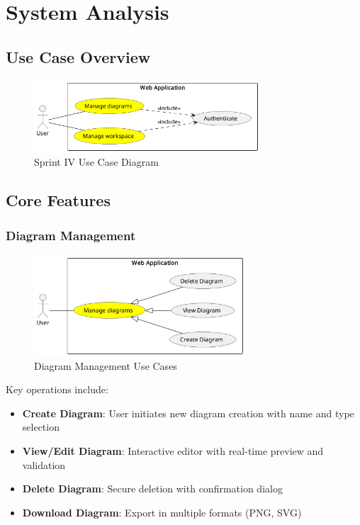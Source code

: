 \section{System Analysis}

\subsection{Use Case Overview}

\begin{figure}[H]
\centering
\includegraphics[width=0.75\textwidth]{conception/SprintIV/use_case_diagrams/use_case_diagram_of_SprintIV.png}
\caption{Sprint IV Use Case Diagram}
\end{figure}

\subsection{Core Features}

\subsubsection{Diagram Management}
\begin{figure}[H]
\centering
\includegraphics[width=0.7\textwidth]{conception/SprintIV/use_case_diagrams/refined_use_case_feature_diagram_management.png}
\caption{Diagram Management Use Cases}
\end{figure}

Key operations include:
\begin{itemize}
    \item \textbf{Create Diagram}: User initiates new diagram creation with name and type selection
    \item \textbf{View/Edit Diagram}: Interactive editor with real-time preview and validation
    \item \textbf{Delete Diagram}: Secure deletion with confirmation dialog
    \item \textbf{Download Diagram}: Export in multiple formats (PNG, SVG)
\end{itemize}

